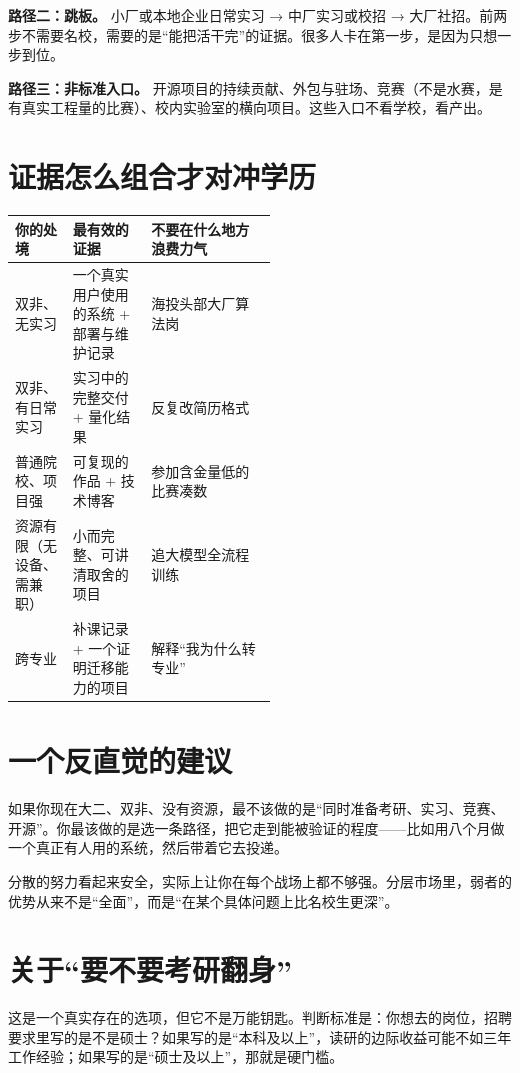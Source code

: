 \documentclass[UTF8,zihao=5,openany]{ctexbook}
\begin{document}
\textbf{路径二：跳板。} 小厂或本地企业日常实习 → 中厂实习或校招 → 大厂社招。前两步不需要名校，需要的是“能把活干完”的证据。很多人卡在第一步，是因为只想一步到位。

\textbf{路径三：非标准入口。} 开源项目的持续贡献、外包与驻场、竞赛（不是水赛，是有真实工程量的比赛）、校内实验室的横向项目。这些入口不看学校，看产出。

\section{证据怎么组合才对冲学历}
\begin{center}\small
\begin{tabularx}{\linewidth}{p{0.22\linewidth}p{0.30\linewidth}Y}
\toprule
你的处境 & 最有效的证据 & 不要在什么地方浪费力气 \\
\midrule
双非、无实习 & 一个真实用户使用的系统 + 部署与维护记录 & 海投头部大厂算法岗 \\
双非、有日常实习 & 实习中的完整交付 + 量化结果 & 反复改简历格式 \\
普通院校、项目强 & 可复现的作品 + 技术博客 & 参加含金量低的比赛凑数 \\
资源有限（无设备、需兼职） & 小而完整、可讲清取舍的项目 & 追大模型全流程训练 \\
跨专业 & 补课记录 + 一个证明迁移能力的项目 & 解释“我为什么转专业” \\
\bottomrule
\end{tabularx}
\end{center}

\section{一个反直觉的建议}
如果你现在大二、双非、没有资源，最不该做的是“同时准备考研、实习、竞赛、开源”。你最该做的是选一条路径，把它走到能被验证的程度——比如用八个月做一个真正有人用的系统，然后带着它去投递。

分散的努力看起来安全，实际上让你在每个战场上都不够强。分层市场里，弱者的优势从来不是“全面”，而是“在某个具体问题上比名校生更深”。

\section{关于“要不要考研翻身”}
这是一个真实存在的选项，但它不是万能钥匙。判断标准是：你想去的岗位，招聘要求里写的是不是硕士？如果写的是“本科及以上”，读研的边际收益可能不如三年工作经验；如果写的是“硕士及以上”，那就是硬门槛。
\end{document}
